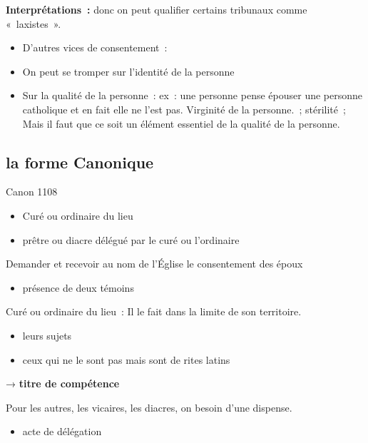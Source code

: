 \textbf{Interprétations~:} donc on peut qualifier certains tribunaux
comme «~laxistes~».

\begin{itemize}
\item
  D'autres vices de consentement~:
\item
   
  On peut se tromper sur l'identité de la personne
   
\item
   
  Sur la qualité de la personne~: ex~: une personne pense épouser une
  personne catholique et en fait elle ne l'est pas. Virginité de la
  personne.~; stérilité~; Mais il faut que ce soit un élément essentiel
  de la qualité de la personne.
   
\end{itemize}

\hypertarget{la-forme-canonique}{%
\subsection{la forme Canonique}\label{la-forme-canonique}}

Canon 1108

\begin{itemize}
\item
  Curé ou ordinaire du lieu
\item
  prêtre ou diacre délégué par le curé ou l'ordinaire
\end{itemize}

Demander et recevoir au nom de l'Église le consentement des époux

\begin{itemize}
\item
  présence de deux témoins
\end{itemize}

Curé ou ordinaire du lieu~: Il le fait dans la limite de son territoire.

\begin{itemize}
\item
  leurs sujets
\item
  ceux qui ne le sont pas mais sont de rites latins
\end{itemize}

→ \textbf{titre de compétence}

Pour les autres, les vicaires, les diacres, on besoin d'une dispense.

\begin{itemize}
\item
  acte de délégation
\end{itemize}

